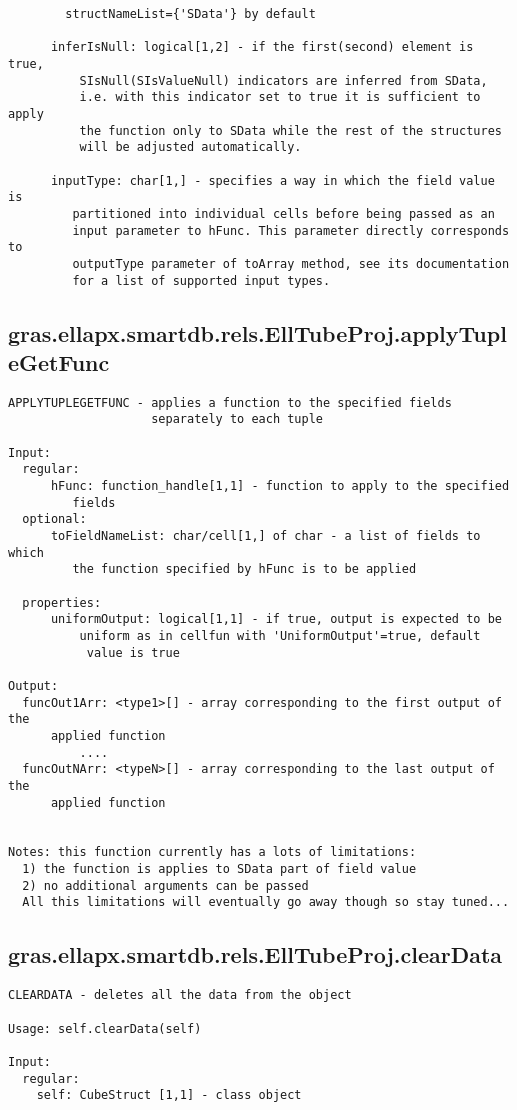 \begin{verbatim}
        structNameList={'SData'} by default

      inferIsNull: logical[1,2] - if the first(second) element is true,
          SIsNull(SIsValueNull) indicators are inferred from SData,
          i.e. with this indicator set to true it is sufficient to apply
          the function only to SData while the rest of the structures
          will be adjusted automatically.

      inputType: char[1,] - specifies a way in which the field value is
         partitioned into individual cells before being passed as an
         input parameter to hFunc. This parameter directly corresponds to
         outputType parameter of toArray method, see its documentation
         for a list of supported input types.
\end{verbatim}
\subsection{\texorpdfstring{gras.ellapx.smartdb.rels.EllTubeProj.applyTupleGetFunc}{applyTupleGetFunc}}\label{method:gras.ellapx.smartdb.rels.EllTubeProj.applyTupleGetFunc}
\begin{verbatim}
APPLYTUPLEGETFUNC - applies a function to the specified fields
                    separately to each tuple

Input:
  regular:
      hFunc: function_handle[1,1] - function to apply to the specified
         fields
  optional:
      toFieldNameList: char/cell[1,] of char - a list of fields to which
         the function specified by hFunc is to be applied

  properties:
      uniformOutput: logical[1,1] - if true, output is expected to be
          uniform as in cellfun with 'UniformOutput'=true, default
           value is true

Output:
  funcOut1Arr: <type1>[] - array corresponding to the first output of the
      applied function
          ....
  funcOutNArr: <typeN>[] - array corresponding to the last output of the
      applied function


Notes: this function currently has a lots of limitations:
  1) the function is applies to SData part of field value
  2) no additional arguments can be passed
  All this limitations will eventually go away though so stay tuned...
\end{verbatim}
\subsection{\texorpdfstring{gras.ellapx.smartdb.rels.EllTubeProj.clearData}{clearData}}\label{method:gras.ellapx.smartdb.rels.EllTubeProj.clearData}
\begin{verbatim}
CLEARDATA - deletes all the data from the object

Usage: self.clearData(self)

Input:
  regular:
    self: CubeStruct [1,1] - class object
\end{verbatim}

